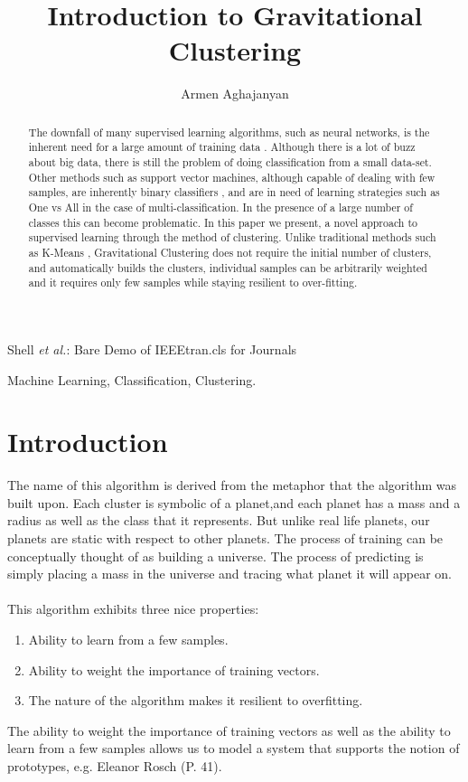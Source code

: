 \documentclass[journal]{IEEEtran}
\begin{document}
\title{Introduction to Gravitational Clustering}

\author{Armen Aghajanyan}
%
{Shell \MakeLowercase{\textit{et al.}}: Bare Demo of IEEEtran.cls for Journals}

\maketitle


\begin{abstract}
The downfall of many supervised learning algorithms, such as neural networks, is the inherent need for a large amount of training data \citep{nndown}. Although there is a lot of buzz about big data, there is still the problem of doing classification from a small data-set. Other methods such as support vector machines, although capable of dealing with few samples, are inherently binary classifiers \citep{svmbinary}, and are in need of learning strategies such as One vs All in the case of multi-classification. In the presence of a large number of classes this can become problematic. In this paper we present, a novel approach to supervised learning through the method of clustering. Unlike traditional methods such as K-Means \citep{kmeans}, Gravitational Clustering does not require the initial number of clusters, and automatically builds the  clusters, individual samples can be arbitrarily weighted and it requires only few samples while staying resilient to over-fitting. 
\end{abstract}

\begin{IEEEkeywords}
Machine Learning, Classification, Clustering.
\end{IEEEkeywords}

\section{Introduction} 
The name of this algorithm is derived from the metaphor that the algorithm was built upon. Each cluster is symbolic of a planet,and each planet has a mass and a radius as well as the class that it represents. But unlike real life planets, our planets are static with respect to other planets. The process of training can be conceptually thought of as building a universe. The process of predicting is simply placing a mass in the universe and tracing what planet it will appear on. 
\\
\\
This algorithm exhibits three nice properties: 
\begin{enumerate}
\item Ability to learn from a few samples.
\item Ability to weight the importance of training vectors.
\item The nature of the algorithm makes it resilient to overfitting.
\end{enumerate}
The ability to weight the importance of training vectors as well as the ability to learn from a few samples allows us to model a system that supports the notion of prototypes, e.g. Eleanor Rosch \citep{proto}(P. 41).
\end{document}
